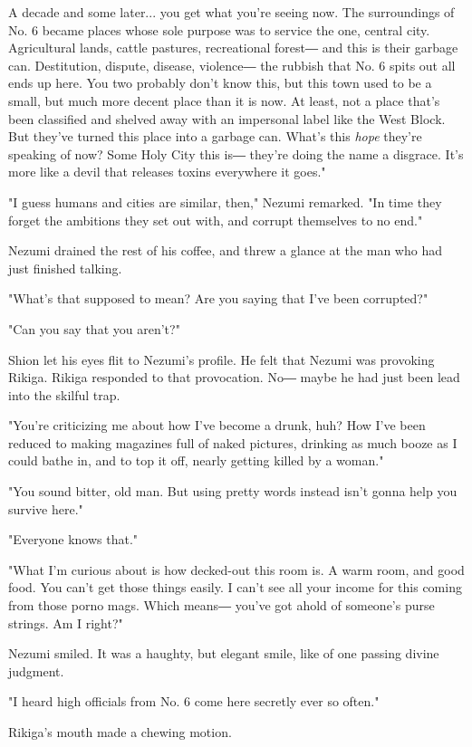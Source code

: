 A decade and some later... you get what you're seeing now. The
surroundings of No. 6 became places whose sole purpose was to service
the one, central city. Agricultural lands, cattle pastures, recreational
forest― and this is their garbage can. Destitution, dispute, disease,
violence― the rubbish that No. 6 spits out all ends up here. You two
probably don't know this, but this town used to be a small, but much
more decent place than it is now. At least, not a place that's been
classified and shelved away with an impersonal label like the West
Block. But they've turned this place into a garbage can. What's this
\emph{hope} they're speaking of now? Some Holy City this is― they're doing the
name a disgrace. It's more like a devil that releases toxins everywhere
it goes."

"I guess humans and cities are similar, then," Nezumi remarked. "In time
they forget the ambitions they set out with, and corrupt themselves to
no end."

Nezumi drained the rest of his coffee, and threw a glance at the man who
had just finished talking.

"What's that supposed to mean? Are you saying that I've been corrupted?"

"Can you say that you aren't?"

Shion let his eyes flit to Nezumi's profile. He felt that Nezumi was
provoking Rikiga. Rikiga responded to that provocation. No― maybe he had
just been lead into the skilful trap.

"You're criticizing me about how I've become a drunk, huh? How I've been
reduced to making magazines full of naked pictures, drinking as much
booze as I could bathe in, and to top it off, nearly getting killed by a
woman."

"You sound bitter, old man. But using pretty words instead isn't gonna
help you survive here."

"Everyone knows that."

"What I'm curious about is how decked-out this room is. A warm room, and
good food. You can't get those things easily. I can't see all your
income for this coming from those porno mags. Which means― you've got
ahold of someone's purse strings. Am I right?"

Nezumi smiled. It was a haughty, but elegant smile, like of one passing
divine judgment.

"I heard high officials from No. 6 come here secretly ever so often."

Rikiga's mouth made a chewing motion.

